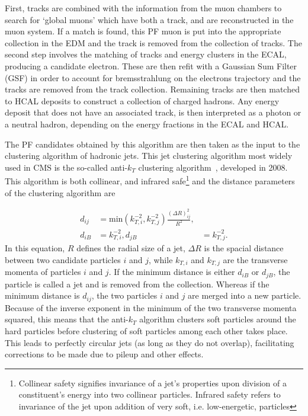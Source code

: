 First, tracks are combined with the information from the muon chambers 
to search for `global muons' which have both a track, and are reconstructed in the muon system. If a match is found, this PF muon is put into the appropriate collection in the EDM
and the track is removed from the collection of tracks. The second step involves the matching of tracks and energy clusters in the ECAL, producing a candidate electron. These are then
refit with a Gaussian Sum Filter (GSF) in order to account for bremsstrahlung on the electrons trajectory and the tracks are removed from the track collection. Remaining tracks are
then matched to HCAL deposits to construct a collection of charged hadrons. Any energy deposit that does not have an associated track, is then interpreted as a photon or a neutral
hadron, depending on the energy fractions in the ECAL and HCAL. 

The PF candidates obtained by this algorithm are then taken as the input to the clustering algorithm of hadronic jets. This jet clustering algorithm most widely used in CMS
is the so-called anti-$k_T$ clustering algorithm~\cite{antikt}, developed in 2008. This algorithm is both collinear, and infrared safe\footnote{Collinear safety signifies invariance
of a jet's properties upon division of a constituent's energy into two collinear particles. Infrared safety refers to invariance of the jet upon addition of very soft, i.e. low-energetic,
particles} and the distance parameters of the clustering algorithm are

\begin{align}
    d_{ij} & = \text{min}\left( k_{T,i}^{-2}, k_{T,j}^{-2} \right) \frac{ (\Delta R)^2_{ij}}{R^2}, \\
    d_{iB} & = k_{T,i}^{-2},
    d_{jB} & = k_{T,j}^{-2}.
\end{align}
In this equation, $R$ defines the radial size of a jet, $\Delta R$ is the spacial distance between two candidate particles $i$ and $j$, while $k_{T,i}$ and $k_{T,j}$ are the transverse
momenta of particles $i$ and $j$. If the minimum distance is either $d_{iB}$ or $d_{jB}$, the particle is called a jet and is removed from the collection. Whereas if the minimum distance
is $d_{ij}$, the two particles $i$ and $j$ are merged into a new particle. Because of the inverse exponent in the minimum of the two transverse momenta squared, this means that the 
anti-$k_T$ algorithm clusters soft particles around the hard particles before clustering of soft particles among each other takes place. This leads to perfectly circular jets (as long as
they do not overlap), facilitating corrections to be made due to pileup and other effects.

